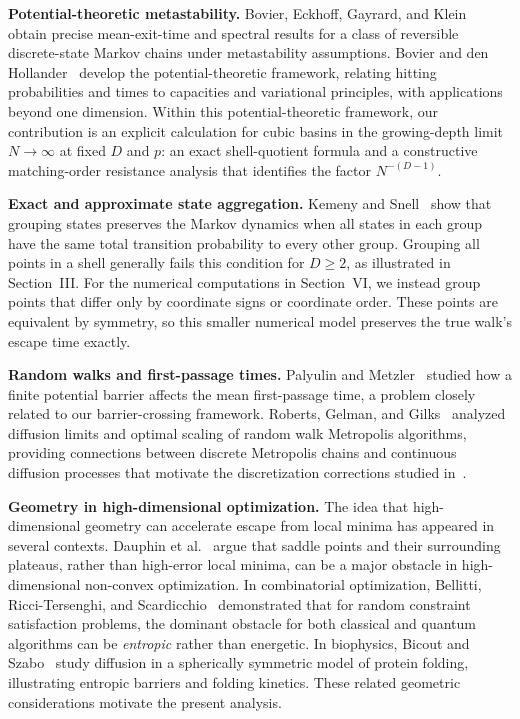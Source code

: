\documentclass[conference]{IEEEtran}
\begin{document}
\textbf{Potential-theoretic metastability.}
Bovier, Eckhoff, Gayrard, and Klein~\cite{bovier2002} obtain precise
mean-exit-time and spectral results for a class of reversible discrete-state
Markov chains under metastability assumptions.
Bovier and den Hollander~\cite{bovier2015} develop the potential-theoretic
framework, relating hitting probabilities and times to capacities and
variational principles, with applications beyond one dimension.
Within this potential-theoretic framework, our contribution
is an explicit calculation for cubic basins in the
growing-depth limit $N\to\infty$ at fixed $D$ and $p$:
an exact shell-quotient formula and a constructive
matching-order resistance analysis that identifies the
factor $N^{-(D-1)}$.

\textbf{Exact and approximate state aggregation.}
Kemeny and Snell~\cite[Sec.~6.3, Thm.~6.3.2]{kemeny1976}
show that grouping states preserves the Markov dynamics when all states in each group have the same total transition probability to every other group. Grouping all points in a shell generally fails this condition for $D\ge2$, as illustrated in Section~III. For the numerical computations in Section~VI, we instead group
points that differ only by coordinate signs or coordinate order. These points are equivalent by symmetry, so this smaller numerical model preserves the true walk's escape time exactly.

\textbf{Random walks and first-passage times.}
Palyulin and Metzler~\cite{palyulin2012} studied how a finite potential barrier
affects the mean first-passage time, a problem closely related to our
barrier-crossing framework.
Roberts, Gelman, and Gilks~\cite{roberts1997} analyzed diffusion limits and
optimal scaling of random walk Metropolis algorithms, providing connections
between discrete Metropolis chains and continuous diffusion processes that
motivate the discretization corrections studied in~\cite{ramachandran2026}.

\textbf{Geometry in high-dimensional optimization.}
The idea that high-dimensional geometry can accelerate escape from
local minima has appeared in several contexts.
Dauphin et al.~\cite{dauphin2014} argue that saddle points
and their surrounding plateaus, rather than high-error local
minima, can be a major obstacle in high-dimensional
non-convex optimization.
In combinatorial optimization, Bellitti, Ricci-Tersenghi, and
Scardicchio~\cite{bellitti2021} demonstrated that for random constraint
satisfaction problems, the dominant obstacle for both classical and
quantum algorithms can be \emph{entropic} rather than energetic. In biophysics, Bicout and Szabo~\cite{bicout2000} study diffusion in
a spherically symmetric model of protein folding, illustrating entropic
barriers and folding kinetics. These related geometric considerations
motivate the present analysis.
\end{document}
